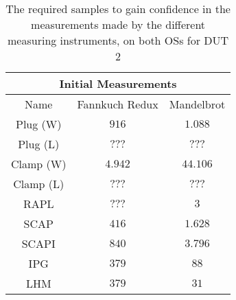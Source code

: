 \begin{table}[H]
    \centering
    \begin{tabular}{|| c | c | c ||}
    \hline
    \multicolumn{3}{||c||}{Initial Measurements} \\ [0.5ex] \hline\hline
    Name & Fannkuch Redux & Mandelbrot \\\hline
    Plug (W) & $916$ & $1.088$ \\
    Plug (L) & $???$ & $???$ \\
    Clamp (W) & $4.942$ & $44.106$ \\
    Clamp (L) & $???$ & $???$ \\
    RAPL & $???$ & $3$ \\
    SCAP & $416$ & $1.628$ \\
    SCAPI & $840$ & $3.796$ \\
    IPG & $379$ & $88$ \\
    LHM & $379$ & $31$ \\\hline
    \end{tabular}
    \caption{The required samples to gain confidence in the measurements made by the different measuring instruments, on both OSs for DUT 2}
    \label{tab:initial-measurements-exp-2-dut-2}
\end{table}